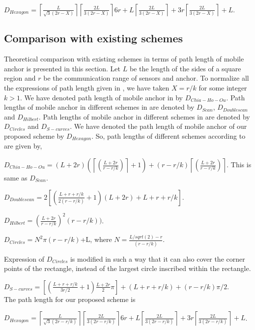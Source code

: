 \documentclass[preprint,11pt]{elsarticle}
\begin{document}
$D_{Hexagon}=\left\lceil{\frac{L}{\sqrt3(2r-X)}}\right\rceil\left\lceil{\frac{2L}{3(2r-X)}}\right\rceil6r+L\left\lceil{\frac{2L}{3(2r-X)}}\right\rceil+
3r\left\lceil{\frac{2L}{3(2r-X)}}\right\rceil+L$.

\subsection{Comparison with existing schemes}

Theoretical comparison with existing schemes \cite{Huang2007,Koutsonikolas2007,Chia-Ho-Ou2013} in terms of path length of mobile anchor
is presented in this section. Let $L$ be the length of the sides of a square region and $r$ be the communication range of sensors and anchor.
To normalize all the expressions of path length given in \cite{Chia-Ho-Ou2013}, we have taken $X=r/k$ for some integer $k>1$.
We have denoted path length of mobile anchor in \cite{Chia-Ho-Ou2013} by $D_{Chia-Ho-Ou}$. Path lengths of mobile anchor in different schemes in \cite{Koutsonikolas2007} are denoted by $D_{Scan}$, $D_{Doublescan}$ and $D_{Hilbert}$. Path lengths of mobile anchor in different schemes in \cite{Huang2007} are denoted by $D_{Circles}$ and $D_{S-curves}$. We have denoted the path length of mobile anchor of our proposed scheme by $D_{Hexagon}$. So, path lengths of different schemes according to \cite{Chia-Ho-Ou2013} are given by,

$D_{Chia-Ho-Ou}=(L+2r)\left(\left\lceil\left(\frac{L+2r}{r-r/k}\right)\right\rceil+1\right)+(r-r/k)\left\lceil\left(\frac{L+2r}{r-r/k}\right)\right\rceil$. This is same as $D_{Scan}$.

$D_{Doublescan}=2\left[\left(\frac{L+r+r/k}{2(r-r/k)}+1\right)(L+2r)+L+r+r/k\right]$.

$D_{Hilbert}=\left(\frac{L+2r}{r-r/k}\right)^2(r-r/k))$.

$D_{Circles}=N^2 \pi(r-r/k)$+L, where $N=\frac{L/sqrt(2)-r}{(r-r/k)}$.

Expression of $D_{Circles}$ is modified in such a way that it can also cover the corner points of the rectangle, instead of the largest circle inscribed within the rectangle.

$D_{S-curves}=\left[\left(\frac{L+r+r/k}{3r/2}+1\right)\frac{L+2r}{2}\pi\right]+(L+r+r/k)+(r-r/k)\pi/2$.\\
The path length for our proposed scheme is

$D_{Hexagon}=\left\lceil{\frac{L}{\sqrt3(2r-r/k)}}\right\rceil\left\lceil{\frac{2L}{3(2r-r/k)}}\right\rceil6r+L\left\lceil{\frac{2L}{3(2r-r/k)}}\right\rceil+3r\left\lceil{\frac{2L}{3(2r-r/k)}}\right\rceil+L$.
\end{document}
